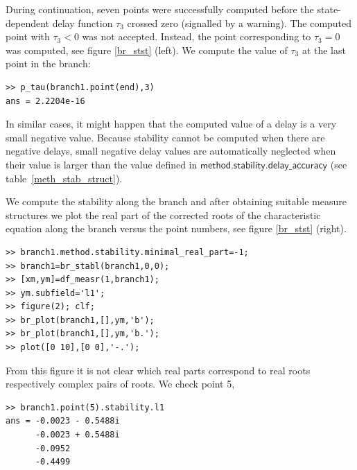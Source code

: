 \documentclass[10pt]{article}
\gdef \parm#1{{\mathsf{#1}}}
\begin{document}
{During continuation, seven points were successfully computed
before the state-dependent delay function $\tau_3$ crossed zero 
(signalled by a warning). 
The computed point with $\tau_3<0$ was not accepted. Instead, the point 
corresponding to $\tau_3=0$ was computed, see figure
\ref{br_stst} (left). We compute the value of $\tau_3$ at 
the last point in the branch:

{\small\begin{verbatim}
>> p_tau(branch1.point(end),3)
ans = 2.2204e-16
\end{verbatim}}
In similar cases, it might happen that the computed value of a delay is 
a very small negative value. 
Because stability cannot be computed when there are negative delays, 
small negative delay values are automatically neglected
when their value is larger than the value defined in
$\parm{method.stability.delay\_accuracy}$ (see table~\ref{meth_stab_struct}).

We compute the stability along the branch and after obtaining suitable 
measure structures we plot the real part of 
the corrected roots of the characteristic equation along the branch
versus the point numbers, see figure \ref{br_stst} (right).
{\small\begin{verbatim}
>> branch1.method.stability.minimal_real_part=-1;
>> branch1=br_stabl(branch1,0,0);
>> [xm,ym]=df_measr(1,branch1);
>> ym.subfield='l1';
>> figure(2); clf;
>> br_plot(branch1,[],ym,'b');
>> br_plot(branch1,[],ym,'b.');
>> plot([0 10],[0 0],'-.');
\end{verbatim}}

From this figure it is not clear which real parts correspond 
to real roots respectively complex pairs of roots. We check point 5,
{\small\begin{verbatim}
>> branch1.point(5).stability.l1
ans = -0.0023 - 0.5488i
      -0.0023 + 0.5488i
      -0.0952          
      -0.4499    
\end{verbatim}}

}
\end{document}
